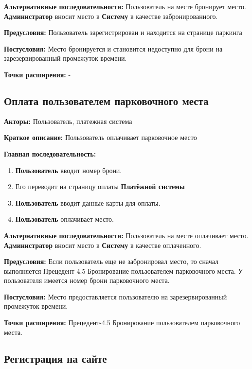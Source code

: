 \textbf{Альтернативные последовательности:} Пользователь на месте бронирует место. \textbf{Администратор} вносит место в \textbf{Систему} в качестве забронированного.

\textbf{Предусловия:} Пользователь зарегистрирован и находится на странице паркинга

\textbf{Постусловия:} Место бронируется и становится недоступно для брони на зарезервированный промежуток времени.

\textbf{Точки расширения:} -




\subsection{Оплата пользователем парковочного места}

\textbf{Акторы:} Пользователь, платежная система

\textbf{Краткое описание:} Пользователь оплачивает парковочное место

\textbf{Главная последовательность:}
\begin{enumerate}
      \item \textbf{Пользователь} вводит номер брони.
      \item Его переводит на страницу оплаты \textbf{Платёжной системы}
      \item \textbf{Пользователь} вводит данные карты для оплаты.
      \item \textbf{Пользователь} оплачивает место.
\end{enumerate}

\textbf{Альтернативные последовательности:} Пользователь на месте оплачивает место. 
\textbf{Администратор} вносит место в \textbf{Систему} в качестве оплаченного.

\textbf{Предусловия:} Если пользователь еще не забронировал место, то сначал выполняется Прецедент-4.5 Бронирование пользователем 
парковочного места. У пользователя имеется номер брони парковочного места.

\textbf{Постусловия:} Место предоставляется пользователю на зарезервированный промежуток времени.

\textbf{Точки расширения:} Прецедент-4.5 Бронирование пользователем парковочного места.




\subsection{Регистрация на сайте}

